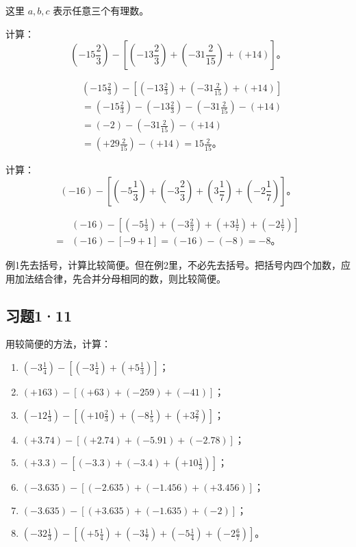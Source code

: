 这里 $a, b, c$ 表示任意三个有理数。

 计算：
\[
\left(-15\frac{2}{3}\right) - \left[\left(-13\frac{2}{3}\right) + \left(-31\frac{2}{15}\right) + (+14)\right]。
\]

\begin{align*}
&\left(-15\frac{2}{3}\right) - \left[\left(-13\frac{2}{3}\right) + \left(-31\frac{2}{15}\right) + (+14)\right] \\
&= \left(-15\frac{2}{3}\right) - \left(-13\frac{2}{3}\right) - \left(-31\frac{2}{15}\right) - (+14) \\
&= (-2) - \left(-31\frac{2}{15}\right) - (+14) \\
&= \left(+29\frac{2}{15}\right) - (+14) = 15\frac{2}{15}。
\end{align*}

 计算：
\[
(-16) - \left[\left(-5\frac{1}{3}\right) + \left(-3\frac{2}{3}\right) + \left(3\frac{1}{7}\right) + \left(-2\frac{1}{7}\right)\right]。
\]

\begin{align*}
&(-16) - \left[\left(-5\frac{1}{3}\right) + \left(-3\frac{2}{3}\right) + \left(+3\frac{1}{7}\right) + \left(-2\frac{1}{7}\right)\right] \\
={}& (-16) - [-9 + 1] = (-16) - (-8) = -8。
\end{align*}

 例1先去括号，计算比较简便。但在例2里，不必先去括号。把括号内四个加数，应用加法结合律，先合并分母相同的数，则比较简便。

\subsection{习题1·11}

用较简便的方法，计算：

\begin{enumerate}
\item \(\left(-3\frac{1}{4}\right) - \left[\left(-3\frac{1}{4}\right) + \left(+5\frac{1}{3}\right)\right]\)；
\item \((+163) - [(+63) + (-259) + (-41)]\)；
\item \(\left(-12\frac{1}{3}\right) - \left[\left(+10\frac{2}{3}\right) + \left(-8\frac{1}{5}\right) + \left(+3\frac{2}{7}\right)\right]\)；
\item \((+3.74) - [(+2.74) + (-5.91) + (-2.78)]\)；
\item \((+3.3) - \left[(-3.3) + (-3.4) + \left(+10\frac{1}{3}\right)\right]\)；
\item \((-3.635) - [(-2.635) + (-1.456) + (+3.456)]\)；
\item \((-3.635) - [(+3.635) + (-1.635) + (-2)]\)；
\item \(\left(-32\frac{1}{3}\right) - \left[\left(+5\frac{1}{4}\right) + \left(-3\frac{1}{7}\right) + \left(-5\frac{1}{4}\right) + \left(-2\frac{6}{7}\right)\right]\)。
\end{enumerate}

